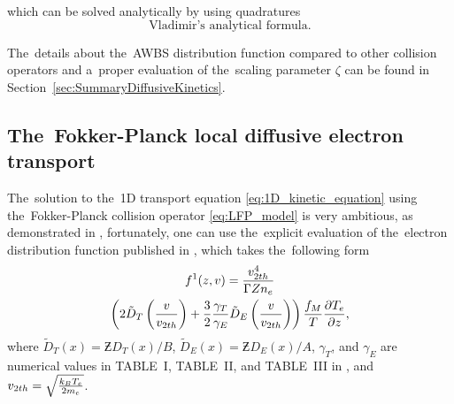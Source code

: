 which can be solved analytically by using quadratures
\begin{equation}
  \text{Vladimir's analytical formula} .
  \label{eq:VT_quadratures}
\end{equation}
 %

The~details about the~AWBS distribution function compared to other
collision operators and a~proper evaluation of the~scaling parameter $\zeta$
can be found in Section~\ref{sec:SummaryDiffusiveKinetics}.

\subsection{The~Fokker-Planck local diffusive electron transport}
\label{sec:FPDiffusiveRegime}

The~solution to the~1D transport equation \eqref{eq:1D_kinetic_equation}
using the~Fokker-Planck collision operator \eqref{eq:LFP_model}
is very ambitious, as demonstrated in 
\cite{Chandrasekhar_RMP1943, CSR_1950, Rosenbluth_PR1957}, fortunately, one 
can use the~explicit evaluation of the~electron distribution function
published in \cite{SpitzerHarm_PR1953}, which takes the~following form
\begin{multline}
  \ft^1(z, \vmag) = %
  \frac{\vtwoh^4}{\Gamma\Zbar n_e}\\
  \left( 2\tilde{D}_T\left(\frac{\vmag}{\vtwoh}\right) 
  + \frac{3}{2}\frac{\gamma_T}{\gamma_E} 
  \tilde{D}_E\left(\frac{\vmag}{\vtwoh}\right) \right)%
  \frac{\fM}{T}\pdv{T_e}{z}  ,
  \label{eq:f1_SH}
\end{multline}
where $\tilde{D}_T(x) = \Zbar D_{T}(x) / B$, 
$\tilde{D}_E(x) = \Zbar D_{E}(x) / A$, $\gamma_T$,
and $\gamma_E$ are numerical values in TABLE~I, TABLE~II, and
TABLE~III in \cite{SpitzerHarm_PR1953}, and 
$v_{2 th} = \sqrt{\frac{k_B T_e}{2m_e}}$.

